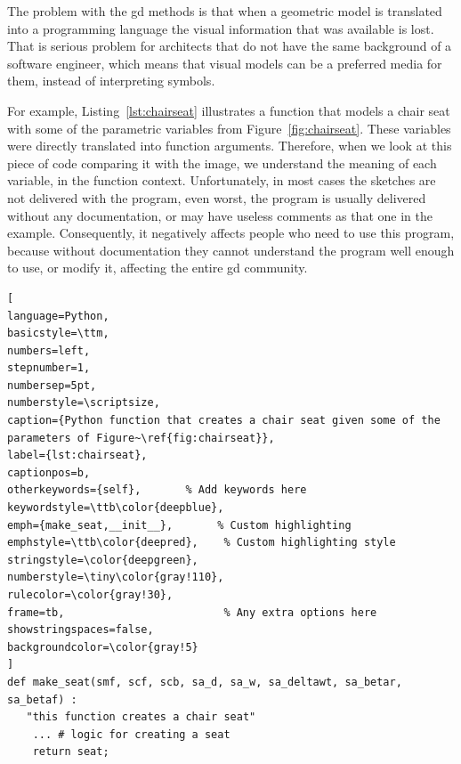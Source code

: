 The problem with the \gls{gd} methods is that when a geometric model is translated into a programming language the visual information that was available is lost. That is serious problem for architects that do not have the same background of a software engineer, which means that visual models can be a preferred media for them, instead of interpreting symbols. 



For example, Listing~\ref{lst:chairseat} illustrates a function that models a chair seat with some of the parametric variables from Figure~\ref{fig:chairseat}. These variables were directly translated into function arguments. Therefore, when we look at this piece of code comparing it with the image, we understand the meaning of each variable, in the function context. Unfortunately, in most cases the sketches are not delivered with the program, even worst, the program is usually delivered without any documentation, or may have useless comments as that one in the example. Consequently, it negatively affects people who need to use this program, because without documentation they cannot understand the program well enough to use, or modify it, affecting the entire \gls{gd} community. \\

\begin{lstlisting}[
language=Python,
basicstyle=\ttm,
numbers=left,
stepnumber=1,
numbersep=5pt,                   
numberstyle=\scriptsize, 
caption={Python function that creates a chair seat given some of the parameters of Figure~\ref{fig:chairseat}},
label={lst:chairseat},
captionpos=b, 
otherkeywords={self},       % Add keywords here
keywordstyle=\ttb\color{deepblue},
emph={make_seat,__init__},       % Custom highlighting
emphstyle=\ttb\color{deepred},    % Custom highlighting style
stringstyle=\color{deepgreen},
numberstyle=\tiny\color{gray!110},
rulecolor=\color{gray!30},
frame=tb,                         % Any extra options here
showstringspaces=false,
backgroundcolor=\color{gray!5} 
]
def make_seat(smf, scf, scb, sa_d, sa_w, sa_deltawt, sa_betar, sa_betaf) :
   "this function creates a chair seat"
    ... # logic for creating a seat
    return seat;
\end{lstlisting}



